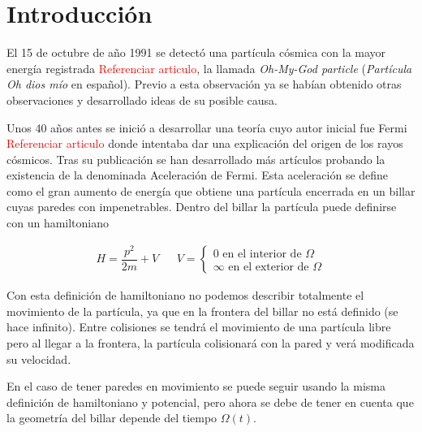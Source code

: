 %
%

\chapter{Introducción}

El 15 de octubre de año 1991 se detectó una partícula cósmica con la mayor energía registrada \textcolor{red}{Referenciar articulo}, la llamada \textit{Oh-My-God particle}\cite{Lee2009a} (\textit{Partícula Oh dios mío} en español). Previo a esta observación ya se habían obtenido otras observaciones y desarrollado ideas de su posible causa.

\vspace{3mm}

Unos 40 años antes se inició a desarrollar una teoría cuyo autor inicial fue Fermi \textcolor{red}{Referenciar articulo} donde intentaba dar una explicación del origen de los rayos cósmicos. Tras su publicación se han desarrollado más artículos probando la existencia de la denominada Aceleración de Fermi. Esta aceleración se define como el gran aumento de energía que obtiene una partícula encerrada en un billar cuyas paredes con impenetrables. Dentro del billar la partícula puede definirse con un hamiltoniano

\begin{align}
    H = \dfrac{p^2}{2m} + V & & V = \begin{cases}
        0 \text{ en el interior de } \Omega \\
        \infty \text{ en el exterior de } \Omega
    \end{cases}
\end{align}

\vspace{3mm}

Con esta definición de hamiltoniano no podemos describir totalmente el movimiento de la partícula, ya que en la frontera del billar no está definido (se hace infinito). Entre colisiones se tendrá el movimiento de una partícula libre pero al llegar a la frontera, la partícula colisionará con la pared y verá modificada su velocidad. 

\vspace{3mm}

En el caso de tener paredes en movimiento se puede seguir usando la misma definición de hamiltoniano y potencial, pero ahora se debe de tener en cuenta que la geometría del billar depende del tiempo \( \Omega(t) \).


